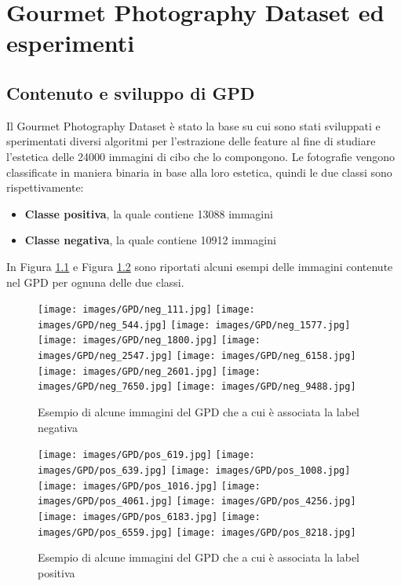 \chapter{Gourmet Photography Dataset ed esperimenti}
\label{GPD}

\section{Contenuto e sviluppo di GPD}
Il Gourmet Photography Dataset \cite{sheng2021learning} è stato la base su cui sono stati sviluppati e sperimentati diversi algoritmi per l'estrazione delle feature al fine di studiare l'estetica delle  24000 immagini di cibo che lo compongono. Le fotografie vengono classificate in maniera binaria in base alla loro estetica, quindi le due classi sono rispettivamente:
\begin{itemize}
  \item \textbf{Classe positiva}, la quale contiene 13088 immagini 
  \item \textbf{Classe negativa}, la quale contiene 10912 immagini 
\end{itemize}

In Figura \ref{negativeGPD} e Figura \ref{positiveGPD} sono riportati alcuni esempi delle immagini contenute nel GPD per ognuna delle due classi.

\begin{figure}[H]
\centering
\texttt{[image: images/GPD/neg\_111.jpg]}
\quad
\texttt{[image: images/GPD/neg\_544.jpg]}
\quad
\vspace{5mm}
\texttt{[image: images/GPD/neg\_1577.jpg]}\\
\quad
\texttt{[image: images/GPD/neg\_1800.jpg]}
\quad
\vspace{5mm}
\texttt{[image: images/GPD/neg\_2547.jpg]}
\quad
\texttt{[image: images/GPD/neg\_6158.jpg]}
\quad
\texttt{[image: images/GPD/neg\_2601.jpg]}
\quad
\vspace{5mm}
\texttt{[image: images/GPD/neg\_7650.jpg]}
\quad
\texttt{[image: images/GPD/neg\_9488.jpg]}
\caption{Esempio di alcune immagini del GPD che a cui è associata la label negativa}
\label{negativeGPD}
\end{figure}

\begin{figure}[H]
\centering
\texttt{[image: images/GPD/pos\_619.jpg]}
\quad
\texttt{[image: images/GPD/pos\_639.jpg]}
\quad
\vspace{5mm}
\texttt{[image: images/GPD/pos\_1008.jpg]}\\
\quad
\texttt{[image: images/GPD/pos\_1016.jpg]}
\quad
\vspace{5mm}
\texttt{[image: images/GPD/pos\_4061.jpg]}
\quad
\texttt{[image: images/GPD/pos\_4256.jpg]}\\
\quad
\texttt{[image: images/GPD/pos\_6183.jpg]}
\quad
\vspace{5mm}
\texttt{[image: images/GPD/pos\_6559.jpg]}
\quad
\texttt{[image: images/GPD/pos\_8218.jpg]}
\caption{Esempio di alcune immagini del GPD che a cui è associata la label positiva}
\label{positiveGPD}
\end{figure}

